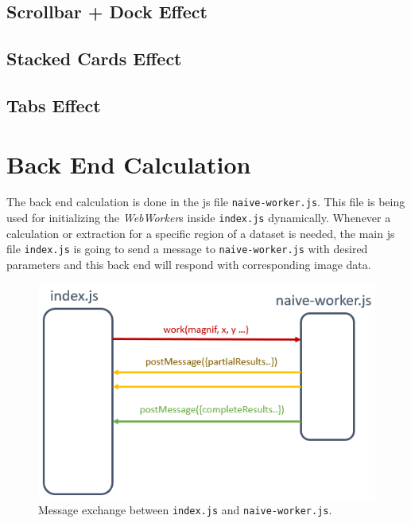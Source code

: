 \subsection{Scrollbar + Dock Effect}

\subsection{Stacked Cards Effect}

\subsection{Tabs Effect}


\section{Back End Calculation}

The back end calculation is done in the \gls{js} file \texttt{naive-worker.js}. This file is being used for initializing the \emph{WebWorker}s inside \texttt{index.js} dynamically. Whenever a calculation or extraction for a specific region of a dataset is needed, the main \gls{js} file \texttt{index.js} is going to send a message to \texttt{naive-worker.js} with desired parameters and this back end will respond with corresponding image data.

\begin{figure}[th]
\centering
\includegraphics{Figures/Chapter4/messageexchange.png}
\decoRule
\caption[Message Exchange]{Message exchange between \texttt{index.js} and \texttt{naive-worker.js}.}
\label{fig:messageexchange}
\end{figure}

